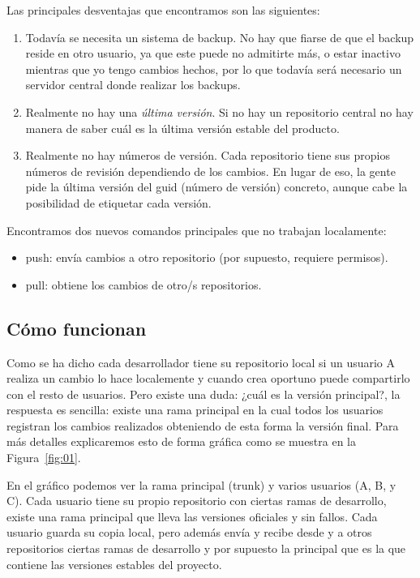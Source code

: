 Las principales desventajas que encontramos son las siguientes:
\begin{enumerate}
\item Todavía se necesita un sistema de backup. No hay que fiarse de que el backup reside en otro usuario, ya que este puede no admitirte más,
o estar inactivo mientras que yo tengo cambios hechos, por lo que todavía será necesario un servidor central donde realizar los backups.
\item Realmente no hay una \textit{última versión}. Si no hay un repositorio central no hay manera de saber cuál es la última versión estable del producto.
\item Realmente no hay números de versión. Cada repositorio tiene sus propios números de revisión dependiendo de los cambios. En lugar de eso, 
la gente pide la última versión del guid (número de versión) concreto, aunque cabe la posibilidad de etiquetar cada versión.
\end{enumerate}

Encontramos dos nuevos comandos principales que no trabajan localamente:
\begin{itemize}
\item push: envía cambios a otro repositorio (por supuesto, requiere permisos).
\item pull: obtiene los cambios de otro/s repositorios.
\end{itemize}


\subsection{Cómo funcionan}
Como se ha dicho cada desarrollador tiene su repositorio local si un usuario A realiza un cambio lo hace localemente y cuando crea oportuno puede
compartirlo con el resto de usuarios. Pero existe una duda: ¿cuál es la versión principal?, la respuesta es sencilla: existe una rama principal
en la cual todos los usuarios registran los cambios realizados obteniendo de esta forma la versión final. 
Para más detalles explicaremos esto de forma gráfica como se muestra en la  Figura~\ref{fig:01}.


En el gráfico podemos ver la rama principal (trunk) y varios usuarios (A, B, y C). Cada usuario tiene su propio repositorio con ciertas ramas de
desarrollo, existe una rama principal que lleva las versiones oficiales y sin fallos. Cada usuario guarda su copia local, pero además envía y 
recibe desde y a otros repositorios ciertas ramas de desarrollo y por supuesto la principal que es la que contiene las versiones estables del 
proyecto.

